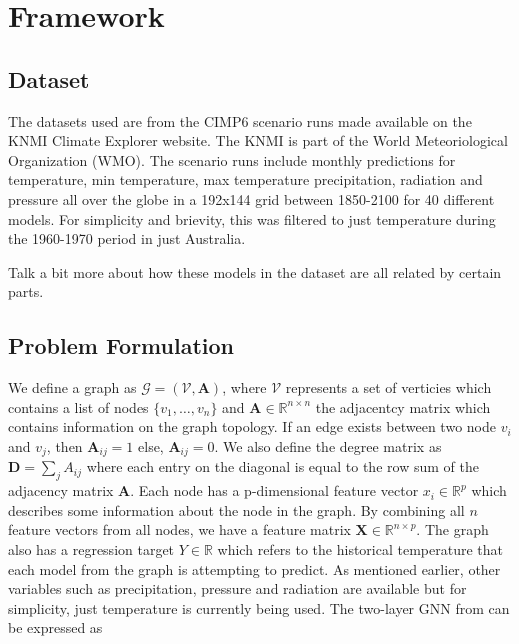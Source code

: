 \documentclass[honours,12pt]{unswthesis}
\numberwithin{equation}{section}
\begin{document}

\chapter{Framework}\label{framework}



\section{Dataset}\label{data}
The datasets used are from the CIMP6 scenario runs made available on the KNMI Climate Explorer website. The KNMI is part of the
World Meteoriological Organization (WMO)\cite{}. The scenario runs include monthly predictions for temperature, min temperature, max temperature
precipitation, radiation and pressure all over the globe in a 192x144 grid between 1850-2100 for 40 different models. For simplicity and brievity, 
this was filtered to just temperature during the 1960-1970 period in just Australia. 

Talk a bit more about how these models in the dataset are all related by certain parts.

{\section{Problem Formulation}}\label{problem-formulation}
We define a graph as ${\mathcal{G}} = ({\mathcal{V}}, \textbf{A})$, where $\mathcal{V}$ represents a set of verticies which contains a list of nodes
$\{ v_1, \dots, v_n \}$ and $\textbf{A} \in \mathbb{R}^{n \times n}$ the adjacentcy matrix which contains information on the graph topology. If an edge exists
between two node $v_i$ and $v_j$, then $\textbf{A}_{ij} = 1$ else, $\textbf{A}_{ij} = 0$. We also define the degree matrix as $\mathbf{D} = \sum_{j}A_{ij}$
where each entry on the diagonal is equal to the row sum of the adjacency matrix $\textbf{A}$.  
Each node has a {p}-dimensional feature vector ${x_i} \in \mathbb{R}^{p}$
which describes some information about the node in the graph. By combining all ${n}$ feature vectors from all nodes, we have a feature matrix
$\textbf{X} \in \mathbb{R}^{n\times p}$. The graph also has a regression target ${Y} \in \mathbb{R}$ which refers to the historical temperature that each model from the
graph is attempting to predict. As mentioned earlier, other variables such as precipitation, pressure and radiation are available but for simplicity, just temperature
is currently being used. The two-layer GNN from \cite{kipf2017semisupervised} can be expressed as
\end{document}
